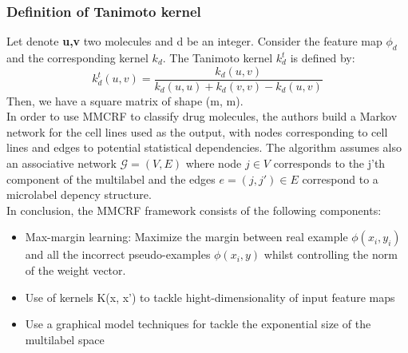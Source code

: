 \documentclass[12pt]{article}
\begin{document}
\subsubsection*{Definition of Tanimoto kernel}
Let denote \textbf{u,v} two molecules and d be an integer. Consider the feature map $\phi_d$ and the corresponding kernel $k_d$. The Tanimoto kernel $k_d^t$ is defined by: $$ k_d^t(u,v) = \frac{k_d(u,v)}{k_d(u,u) + k_d(v,v) - k_d(u,v)} $$
Then, we have a square matrix of shape (m, m).
\\
In order to use MMCRF to classify drug molecules, the authors build a Markov network for the cell lines used as the output, with nodes corresponding to cell lines and edges to potential statistical dependencies.
The algorithm assumes also an associative network $\mathcal{G} = (V,E)$ where node $j \in V$ corresponds to the j'th component of the multilabel and the edges $e = (j,j') \in E$ correspond to a microlabel depency structure.\\
In conclusion, the MMCRF framework consists of the following components:
\begin{itemize}
	\item Max-margin learning: Maximize the margin between real example $\phi(x_i,y_i)$ and all the incorrect pseudo-examples $\phi(x_i,y)$ whilst controlling the norm of the weight vector.
	\item Use of kernels K(x, x') to tackle hight-dimensionality of input feature maps
	\item Use a graphical model techniques for tackle the exponential size of the multilabel space
\end{itemize}
\end{document}
